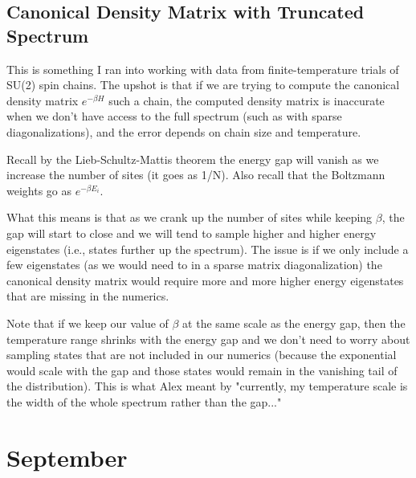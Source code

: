 \documentclass{report}
\begin{document}
\section{Canonical Density Matrix with Truncated Spectrum}
This is something I ran into working with data from finite-temperature trials of
SU(2) spin chains. The upshot is that if we are trying to compute the canonical density 
matrix $ e^{-\beta H} $ such a chain, the computed density matrix is inaccurate
when we don't have access to the full spectrum (such as with sparse
diagonalizations), and the error depends on chain size and temperature.

Recall by the Lieb-Schultz-Mattis theorem the
energy gap will vanish as we increase the number of sites (it goes as 1/N). Also
recall that the Boltzmann weights go as $e^{-\beta E_i}$. 

What this means is that as we crank up the number of sites while keeping
$\beta$, the gap will start to close and we will tend to sample higher and
higher energy eigenstates (i.e., states further up the spectrum). The issue is
if we only include a few eigenstates (as we would need to in a sparse matrix
diagonalization) the canonical density matrix would require more and more higher
energy eigenstates that are missing in the numerics. 

Note that if we keep our value of $\beta$ at the same scale as the energy gap,
then the temperature range shrinks with the energy gap and we don't need to
worry about sampling states that are not included in our numerics (because the
exponential would scale with the gap and those states would remain in the
vanishing tail of the distribution). This is what Alex meant by "currently, my
temperature scale is the width of the whole spectrum rather than the gap..."

\chapter{September}
\begin{tocbox}
\minitoc
\end{tocbox}
\end{document}
